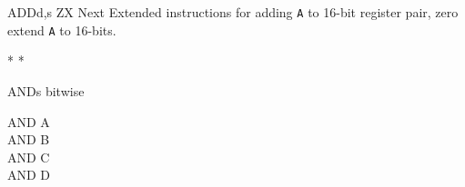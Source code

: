 \begin{basedescript}{
	\desclabelstyle{\multilinelabel}
	\desclabelwidth{3cm}}
\begin{DetailItem}{ADD}{d,s}
		ZX Next Extended instructions for adding {\tt A} to 16-bit register pair, zero extend {\tt A} to 16-bits.

		\begin{DetailEffects}[v]
			\FlagsADDr[8-bit]
			\FlagsADDrr[16-bit]
		\end{DetailEffects}

		\begin{DetailEffectsFlags}
			\DetailFlagHF{\DetailFlagResultHalfCarry*}*
			*
			\DetailFlagCF{\DetailFlagResultCarry*}
		\end{DetailEffectsFlags}

		\begin{DetailEffects}
		\end{DetailEffects}

		\begin{DetailTiming}
		\end{DetailTiming}

	\end{DetailItem}

	\pagebreak


	\begin{DetailItem}{AND}{s}
		{bitwise }
		{}

		\begin{DetailVariants}[4]
			AND A\\
			AND B\\
			AND C\\
			AND D


\end{DetailVariants}
\end{DetailItem}
\end{basedescript}
